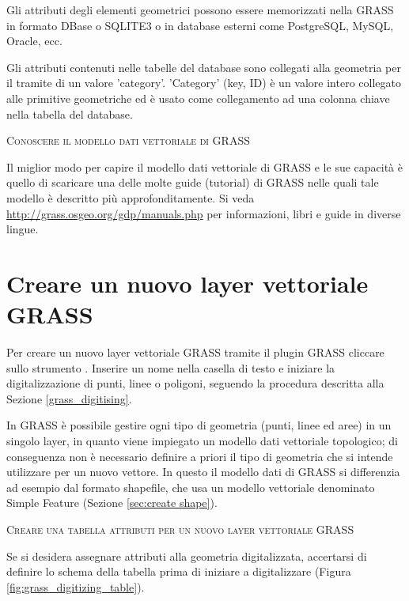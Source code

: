 Gli attributi degli elementi geometrici possono essere memorizzati nella
 GRASS in formato DBase o SQLITE3 o in database esterni
come PostgreSQL, MySQL, Oracle, ecc.

Gli attributi contenuti nelle tabelle del database sono collegati alla 
geometria per il tramite di un valore 'category'.
'Category' (key, ID) è un valore intero collegato alle primitive geometriche
ed è usato come collegamento ad una colonna chiave nella tabella del database.

\begin{Tip}\caption{\textsc{Conoscere il modello dati vettoriale di GRASS}}
Il miglior modo per capire il modello dati vettoriale di GRASS e le sue
capacità è quello di scaricare una delle molte guide (tutorial) di GRASS nelle 
quali tale modello è descritto più approfonditamente. Si veda
\url{http://grass.osgeo.org/gdp/manuals.php} per informazioni, libri e
guide in diverse lingue.
\end{Tip} 

\section{Creare un nuovo layer vettoriale GRASS}\label{sec:creating_new_grass_vectors}

Per creare un nuovo layer vettoriale GRASS tramite il plugin GRASS cliccare
sullo strumento . 
Inserire un nome nella casella di testo e iniziare la digitalizzazione di
punti, linee o poligoni, seguendo la procedura descritta alla Sezione
\ref{grass_digitising}. 

In GRASS è possibile gestire ogni tipo di geometria (punti, linee
ed aree) in un singolo layer, in quanto viene impiegato un modello dati
vettoriale topologico; di conseguenza non è necessario definire a priori il tipo di
geometria che si intende utilizzare per un nuovo vettore. 
In questo il modello dati di GRASS si differenzia ad esempio dal formato shapefile, 
che usa un modello vettoriale denominato Simple Feature (Sezione \ref{sec:create shape}).

\begin{Tip}\caption{\textsc{Creare una tabella attributi per un nuovo layer vettoriale GRASS}}
Se si desidera assegnare attributi alla geometria digitalizzata, accertarsi di
definire lo schema della tabella prima di iniziare a digitalizzare (Figura \ref{fig:grass_digitizing_table}).
\end{Tip} 

